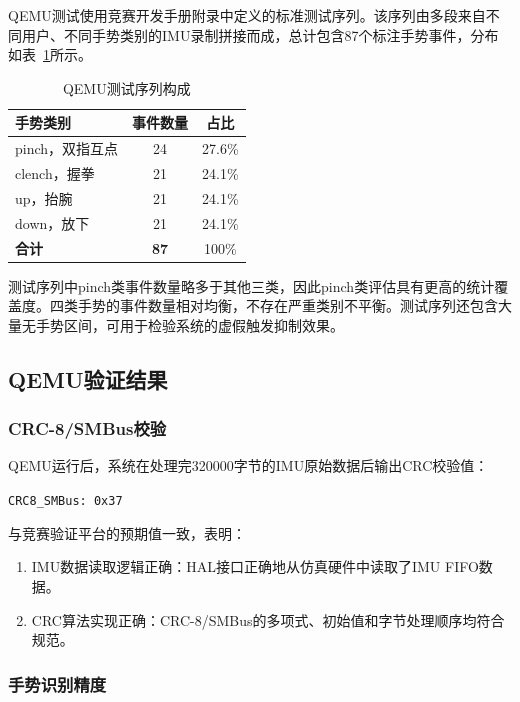 \documentclass[lettersize,journal]{IEEEtran}
\begin{document}
QEMU测试使用竞赛开发手册附录中定义的标准测试序列。该序列由多段来自不同用户、不同手势类别的IMU录制拼接而成，总计包含87个标注手势事件，分布如表~\ref{tab:qemu_sequence}所示。

\begin{table}[htbp]
    \centering
    \caption{QEMU测试序列构成}
    \label{tab:qemu_sequence}
    \begin{tabular}{lcc}
        \toprule
        \textbf{手势类别} & \textbf{事件数量} & \textbf{占比} \\
        \midrule
        pinch，双指互点 & 24 & 27.6\% \\
        clench，握拳   & 21 & 24.1\% \\
        up，抬腕       & 21 & 24.1\% \\
        down，放下     & 21 & 24.1\% \\
        \midrule
        \textbf{合计}   & \textbf{87} & 100\% \\
        \bottomrule
    \end{tabular}
\end{table}

测试序列中pinch类事件数量略多于其他三类，因此pinch类评估具有更高的统计覆盖度。四类手势的事件数量相对均衡，不存在严重类别不平衡。测试序列还包含大量无手势区间，可用于检验系统的虚假触发抑制效果。

\subsection{QEMU验证结果}

\subsubsection{CRC-8/SMBus校验}

QEMU运行后，系统在处理完320000字节的IMU原始数据后输出CRC校验值：
\begin{center}
    \texttt{CRC8\_SMBus: 0x37}
\end{center}

与竞赛验证平台的预期值一致，表明：
\begin{enumerate}
    \item IMU数据读取逻辑正确：HAL接口正确地从仿真硬件中读取了IMU FIFO数据。
    \item CRC算法实现正确：CRC-8/SMBus的多项式、初始值和字节处理顺序均符合规范。
\end{enumerate}

\subsubsection{手势识别精度}
\end{document}
